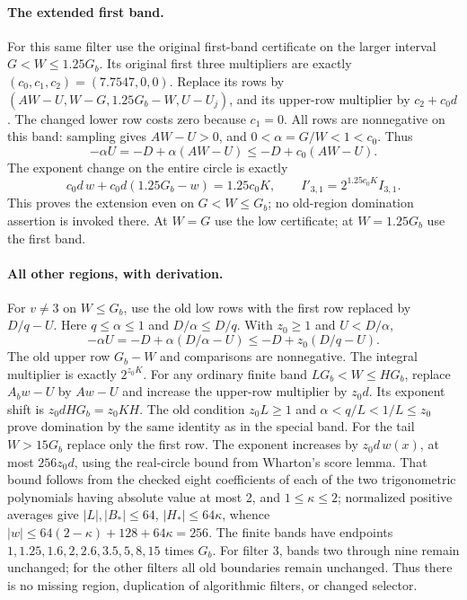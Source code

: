 \paragraph{The extended first band.}
For this same filter use the original first-band certificate on the
larger interval $G<W\le 1.25G_b$. Its original first three multipliers
are exactly $(c_0,c_1,c_2)=(7.7547,0,0)$.
Replace its rows by
$(AW-U,W-G,1.25G_b-W,U-U_j)$, and its upper-row multiplier by
$c_2+c_0d$. The changed lower row costs zero because $c_1=0$.
All rows are nonnegative on this band: sampling gives $AW-U>0$,
and $0<\alpha=G/W<1<c_0$. Thus
\[
 -\alpha U=-D+\alpha(AW-U)\le-D+c_0(AW-U).
\]
The exponent change on the entire circle is exactly
\[
 c_0d\,w+c_0d(1.25G_b-w)=1.25c_0K,
 \qquad I'_{3,1}=2^{1.25c_0K}I_{3,1}.
\]
This proves the extension even on $G<W\le G_b$; no old-region
domination assertion is invoked there. At $W=G$ use the low certificate;
at $W=1.25G_b$ use the first band.

\paragraph{All other regions, with derivation.}
For $v\ne3$ on $W\le G_b$, use the old low rows with the first row
replaced by $D/q-U$. Here $q\le\alpha\le1$ and
$D/\alpha\le D/q$. With $z_0\ge1$ and $U<D/\alpha$,
\[
 -\alpha U=-D+\alpha(D/\alpha-U)
 \le-D+z_0(D/q-U).
\]
The old upper row $G_b-W$ and comparisons are nonnegative. The integral
multiplier is exactly $2^{z_0K}$.
For any ordinary finite band $LG_b<W\le HG_b$, replace
$A_bw-U$ by $Aw-U$ and increase the upper-row multiplier by $z_0d$.
Its exponent shift is $z_0dHG_b=z_0KH$. The old condition
$z_0L\ge1$ and $\alpha<q/L<1/L\le z_0$ prove domination by the
same identity as in the special band. For the tail $W>15G_b$ replace
only the first row. The exponent increases by $z_0d\,w(x)$, at most
$256z_0d$, using the real-circle bound from Wharton's score lemma.
That bound follows from the checked eight coefficients of each of the
two trigonometric polynomials having absolute value at most 2, and
$1\le\kappa\le2$; normalized positive averages give
$|L|,|B_*|\le64$, $|H_*|\le64\kappa$, whence
$|w|\le64(2-\kappa)+128+64\kappa=256$.
The finite bands have endpoints $1,1.25,1.6,2,2.6,3.5,5,8,15$ times
$G_b$. For filter 3, bands two through nine remain unchanged; for the
other filters all old boundaries remain unchanged. Thus there is no
missing region, duplication of algorithmic filters, or changed selector.

